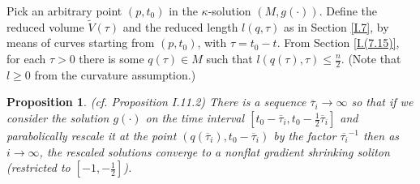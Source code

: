 \documentclass[12pt]{amsart}
\numberwithin{equation}{section}
\theoremstyle{plain}
\newtheorem{proposition}[equation]{Proposition}
\theoremstyle{definition}
\theoremstyle{remark}
\begin{document}
Pick an arbitrary point $(p, t_0)$ in the $\kappa$-solution $(M, g(\cdot))$. Define
the reduced volume $\widetilde{V}(\tau)$ and the reduced length
$l(q, \tau)$ as in Section \ref{I.7}, by means of curves starting from
$(p, t_0)$, with $\tau = t_0 - t$. From 
Section \ref{I.(7.15)}, for each $\tau> 0$ there is some
$q(\tau)\in M$ such that $l(q(\tau), \tau) \le \frac{n}{2}$. (Note that
$l \ge 0$ from the curvature assumption.)

\begin{proposition} (cf. Proposition I.11.2) \label{asympsoliton}
There is a sequence $\overline{\tau}_i \rightarrow \infty$ so that if we
consider the solution $g(\cdot)$ on the time interval
$[t_0 - \overline{\tau}_i, t_0 - \frac12 \overline{\tau}_i]$  and 
parabolically rescale it
at the point $(q(\overline{\tau}_i), t_0 - 
\overline{\tau}_i)$ by the factor $\overline{\tau_i}^{-1}$ then as
$i \rightarrow \infty$, the
rescaled solutions
converge to a nonflat gradient shrinking soliton (restricted to $[-1, - \frac12]$).
\end{proposition}
\end{document}

